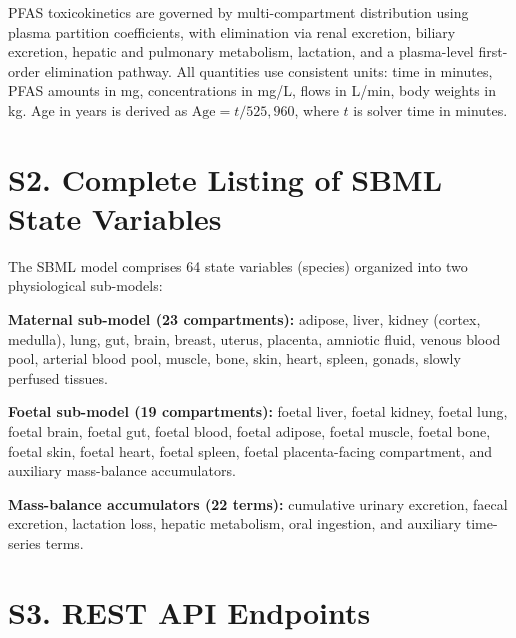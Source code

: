 \documentclass[12pt]{article}
\begin{document}
PFAS toxicokinetics are governed by multi-compartment distribution
using plasma partition coefficients, with elimination via renal
excretion, biliary excretion, hepatic and pulmonary metabolism,
lactation, and a plasma-level first-order elimination pathway.
All quantities use consistent units: time in minutes, PFAS amounts
in mg, concentrations in mg/L, flows in L/min, body weights in kg.
Age in years is derived as $\text{Age} = t / 525{,}960$, where $t$
is solver time in minutes.

\section*{S2. Complete Listing of SBML State Variables}


The SBML model comprises 64 state variables (species) organized
into two physiological sub-models:

\textbf{Maternal sub-model (23 compartments):} adipose, liver, kidney
(cortex, medulla), lung, gut, brain, breast, uterus, placenta,
amniotic fluid, venous blood pool, arterial blood pool, muscle, bone,
skin, heart, spleen, gonads, slowly perfused tissues.

\textbf{Foetal sub-model (19 compartments):} foetal liver, foetal
kidney, foetal lung, foetal brain, foetal gut, foetal blood, foetal
adipose, foetal muscle, foetal bone, foetal skin, foetal heart,
foetal spleen, foetal placenta-facing compartment, and auxiliary
mass-balance accumulators.

\textbf{Mass-balance accumulators (22 terms):} cumulative urinary
excretion, faecal excretion, lactation loss, hepatic metabolism,
oral ingestion, and auxiliary time-series terms.

\section*{S3. REST API Endpoints}
\end{document}
